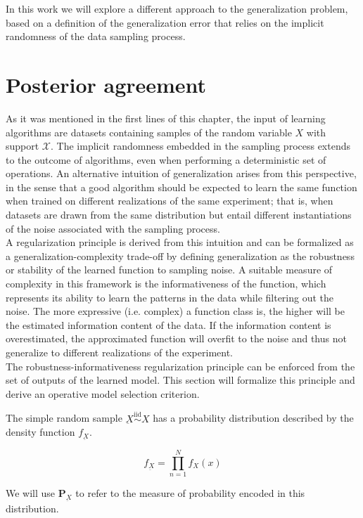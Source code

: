 In this work we will explore a different approach to the generalization problem, based on
a definition of the generalization error that relies on the implicit randomness of the
data sampling process. 

\section{Posterior agreement}

As it was mentioned in the first lines of this chapter, the input of learning algorithms are
datasets containing samples of the random variable $X$ with support $\mathcal{X}$. The
implicit randomness embedded in the sampling process extends to the outcome of algorithms,
even when performing a deterministic set of operations. An alternative intuition of 
generalization arises from this perspective, in the sense that a good algorithm should be
expected to learn the same function when trained on different realizations 
of the same experiment; that is, when datasets are drawn from the same distribution 
but entail different instantiations of the noise associated with the sampling process. \\

A regularization principle is derived from this intuition and can be formalized as a
generalization-complexity trade-off by defining generalization as the robustness or stability
of the learned function to sampling noise. A suitable measure of complexity in this framework
is the informativeness of the function, which represents its ability to learn the patterns in the
data while filtering out the noise. The more expressive (i.e. complex) a function class is,
the higher will be the estimated information content of the data. If the information content is
overestimated, the approximated function will overfit to the noise and thus not generalize to
different realizations of the experiment. \\

The robustness-informativeness regularization principle can be enforced from the set 
of outputs of the learned model. This section will formalize this principle and derive an
operative model selection criterion.

\begin{definition}
    The simple random sample $\underbar{X} \overset{\text{iid}}{\sim} X$ has a probability distribution
    described by the density function $f_{\underbar{X}}$.

    $$
     f_{\underbar{X}} = \prod_{n=1}^{N} f_{X}(x)
    $$

    We will use $\mathbf{P}_{\underbar{X}}$ to refer to the measure of probability encoded in this distribution.
\end{definition}

